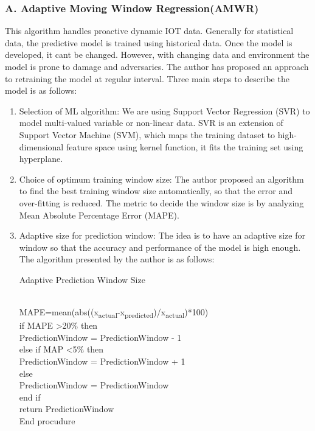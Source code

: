 \documentclass[runningheads]{llncs}
\begin{document}
\subsubsection{A. Adaptive Moving Window Regression(AMWR)} This algorithm handles proactive dynamic IOT data. Generally for statistical data, the predictive model is trained using historical data. Once the model is developed, it cant be changed. However, with changing data and environment the model is prone to damage and adversaries. The author \cite{17} has proposed an approach to retraining the model at regular interval. Three main steps to describe the model is as follows:
\begin{enumerate}
	\item Selection of ML algorithm: We are using Support Vector Regression (SVR) to model multi-valued variable or non-linear data. SVR is an extension of Support Vector Machine (SVM), which maps the training dataset to high-dimensional feature space using kernel function, it fits the training set using hyperplane.
	\item Choice of optimum training window size: The author proposed an algorithm to find the best training window size automatically, so that the error and over-fitting is reduced. The metric to decide the window size is by analyzing Mean Absolute Percentage Error (MAPE). 
	\item Adaptive size for prediction window: The idea is to have an adaptive size for window so that the accuracy and performance of the model is high enough. The algorithm presented by the author is as follows:
\begin{algorithm}
\caption{Adaptive Prediction Window Size}\label{Adaptive Prediction Window Size}
\begin{algorithmic}[1]
	\\MAPE=mean(abs((x\textsubscript{actual}-x\textsubscript{predicted})/x\textsubscript{actual})*100)\\
	if MAPE \textgreater 20\% then \\
		PredictionWindow = PredictionWindow - 1 \\
	else if MAP \textless 5\% then \\
	PredictionWindow = PredictionWindow + 1 \\
	else\\
	PredictionWindow = PredictionWindow\\
	end if\\
	return PredictionWindow\\
	End procudure
	
\EndProcedure 
\end{algorithmic}
\end{algorithm}


\end{enumerate}
\end{document}
